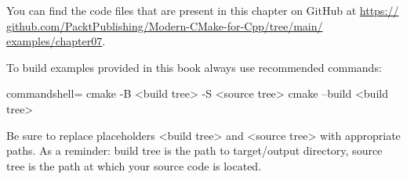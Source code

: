 You can find the code files that are present in this chapter on GitHub at \url{https:// github.com/PacktPublishing/Modern-CMake-for-Cpp/tree/main/ examples/chapter07}.

To build examples provided in this book always use recommended commands:

\begin{tcblisting}{commandshell={}}
cmake -B <build tree> -S <source tree>
cmake --build <build tree>
\end{tcblisting}

Be sure to replace placeholders <build tree> and <source tree> with appropriate paths. As a reminder: build tree is the path to target/output directory, source tree is the path at which your source code is located.